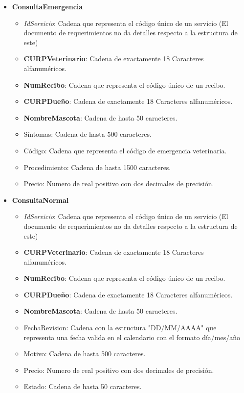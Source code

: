 \documentclass{exam}
\begin{document}
\begin{itemize}
	\item \textbf{ConsultaEmergencia}
		\begin{itemize}
			\item \textit{IdServicio}: Cadena que representa el código único de un servicio (El documento de requerimientos no da detalles respecto a la estructura de este)
			\item \textbf{CURPVeterinario}: Cadena de exactamente 18 Caracteres alfanuméricos.
			\item \textbf{NumRecibo}: Cadena que representa el código único de un recibo.
			\item \textbf{CURPDueño}: Cadena de exactamente 18 Caracteres alfanuméricos.
			\item \textbf{NombreMascota}: Cadena de hasta 50 caracteres.
			\item Síntomas: Cadena de hasta 500 caracteres.
			\item Código: Cadena que representa el código de emergencia veterinaria.
			\item Procedimiento: Cadena de hasta 1500 caracteres.
			\item Precio: Numero de real positivo con dos decimales de precisión.
		\end{itemize}
		
	\item \textbf{ConsultaNormal}
		\begin{itemize}
			\item \textit{IdServicio}: Cadena que representa el código único de un servicio (El documento de requerimientos no da detalles respecto a la estructura de este)
			\item \textbf{CURPVeterinario}: Cadena de exactamente 18 Caracteres alfanuméricos.
			\item \textbf{NumRecibo}: Cadena que representa el código único de un recibo.
			\item \textbf{CURPDueño}: Cadena de exactamente 18 Caracteres alfanuméricos.
			\item \textbf{NombreMascota}: Cadena de hasta 50 caracteres.
			\item FechaRevision: Cadena con la estructura "DD/MM/AAAA" que representa una fecha valida en el calendario con el formato día/mes/año
			\item Motivo: Cadena de hasta 500 caracteres.
			\item Precio: Numero de real positivo con dos decimales de precisión.
			\item Estado: Cadena de hasta 50 caracteres.
		\end{itemize}
		

\end{itemize}
\end{document}
